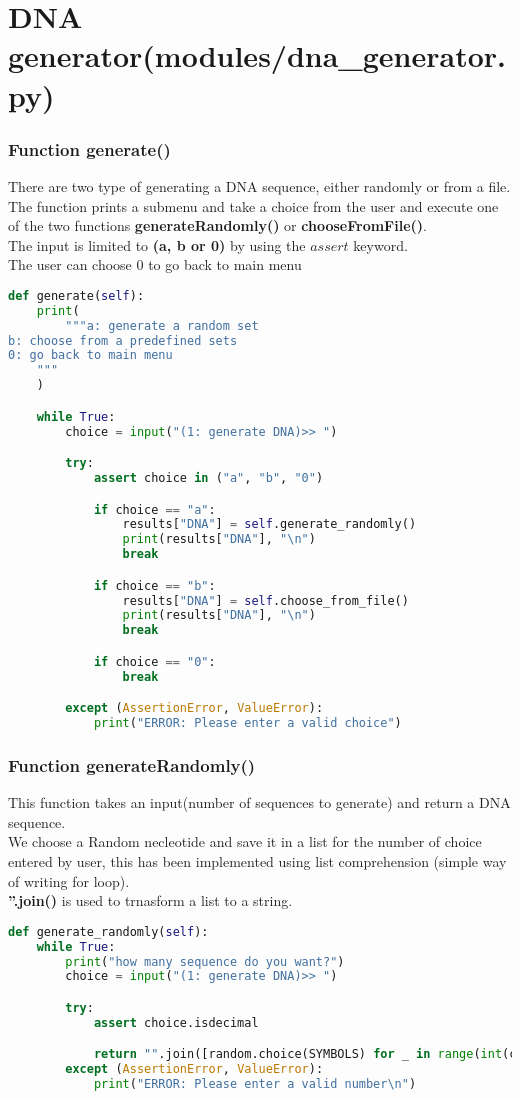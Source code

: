 \documentclass[11pt]{article}
\begin{document}
\section{DNA generator(modules/dna\_generator.py)}
\subsubsection{Function generate()}
There are two type of generating a DNA sequence, either randomly or from a file.\\
The function prints a submenu and take a choice from the user and execute one of the two functions \textbf{generateRandomly()} or \textbf{chooseFromFile()}.\\
The input is limited to \textbf{(a, b or 0)} by using the \(assert\) keyword.\\
The user can choose \(0\) to go back to main menu

\begin{lstlisting}[language=Python, style=PythonStyle]
def generate(self):
    print(
        """a: generate a random set
b: choose from a predefined sets
0: go back to main menu
    """
    )

    while True:
        choice = input("(1: generate DNA)>> ")

        try:
            assert choice in ("a", "b", "0")

            if choice == "a":
                results["DNA"] = self.generate_randomly()
                print(results["DNA"], "\n")
                break

            if choice == "b":
                results["DNA"] = self.choose_from_file()
                print(results["DNA"], "\n")
                break

            if choice == "0":
                break

        except (AssertionError, ValueError):
            print("ERROR: Please enter a valid choice")
\end{lstlisting}

\subsubsection{Function generateRandomly()}
This function takes an input(number of sequences to generate) and return a DNA sequence.\\
We choose a Random necleotide and save it in a list for the number of choice entered by user, this has been implemented using list comprehension (simple way of writing for loop).\\
\textbf{''.join()} is used to trnasform a list to a string.
\begin{lstlisting}[language=Python, style=PythonStyle]
def generate_randomly(self):
    while True:
        print("how many sequence do you want?")
        choice = input("(1: generate DNA)>> ")

        try:
            assert choice.isdecimal

            return "".join([random.choice(SYMBOLS) for _ in range(int(choice))])
        except (AssertionError, ValueError):
            print("ERROR: Please enter a valid number\n")
\end{lstlisting}
\end{document}
